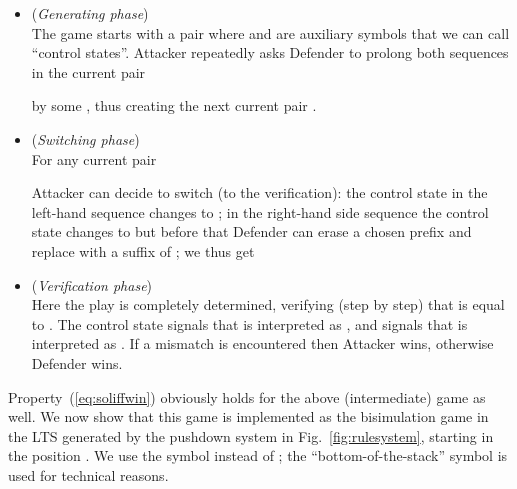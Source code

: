 \documentclass[11pt]{article}
\begin{document}
\begin{itemize}
\item
(\emph{Generating phase}) 
\\
The game starts with a pair  where 
and  are auxiliary symbols that we can call ``control
states''.
Attacker repeatedly asks Defender to prolong 
both sequences in the current pair 
 
by some ,
thus creating the next current pair 
. 
\item
(\emph{Switching phase}) 
\\
For any current pair 

Attacker can decide to switch (to the verification): 
the control state in the left-hand sequence changes to ;
in the right-hand side sequence 
the control state changes to  but before that
Defender can erase a chosen prefix 
 and replace 
 with a suffix  of ; we thus get

\item
(\emph{Verification phase})
\\
Here the play is completely determined, verifying (step by step)
that 
  is equal
to
 .
The control state  signals that  is interpreted as 
, and  signals that  is interpreted as 
.
If a mismatch is encountered then Attacker wins, otherwise Defender wins.
\end{itemize}
Property~(\ref{eq:soliffwin}) obviously holds  
for the above (intermediate) game as well.
We now show that 
this game is implemented as the bisimulation game 
in the LTS generated by the pushdown system 
in Fig.~\ref{fig:rulesystem}, 
starting in the position .
We use the symbol  instead of ; 
the ``bottom-of-the-stack'' symbol
 is used for technical reasons.
\end{document}
